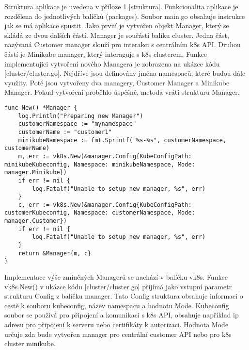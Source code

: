     Struktura aplikace je uvedena v příloze 1 [struktura]. Funkcionalita aplikace je rozdělena do jednotlivých balíčků (packages). Soubor main.go obsahuje instrukce jak se má aplikace spustit. Jako první je vytvořen objekt Manager, který se skládá ze dvou dalších částí. Manager je součástí balíku cluster. Jedna část, nazývaná Customer manager slouží pro interakci s centrálním k8s API. Druhou částí je Minikube manager, který interaguje s k8s clusterem. Funkce implementujici vytvoření nového Managera je zobrazena na ukázce kódu [cluster/cluster.go]. Nejdříve jsou definovány jména namespaců, které budou dále využity. Poté jsou vytvořeny dva managery, Customer Manager a Minikube Manager. Pokud vytvoření proběhlo úspěšně, metoda vrátí strukturu Manager. 

\begin{lstlisting}[caption=funkce vytvoření nového managera]
func New() *Manager {
	log.Println("Preparing new Manager")
	customerNamespace := "mynamespace"
	customerName := "customer1"
	minikubeNamespace := fmt.Sprintf("%s-%s", customerNamespace, customerName)
	m, err := vk8s.New(&manager.Config{KubeConfigPath: minikubeKubeconfig, Namespace: minikubeNamespace, Mode: manager.Minikube})
	if err != nil {
		log.Fatalf("Unable to setup new manager, %s", err)
	}
	c, err := vk8s.New(&manager.Config{KubeConfigPath: customerKubeconfig, Namespace: customerNamespace, Mode: manager.Customer})
	if err != nil {
		log.Fatalf("Unable to setup new manager, %s", err)
	}
	return &Manager{m, c}
}
\end{lstlisting}
\par
											Implementace výše zmíněných Managerů se nachází v balíčku vk8s. Funkce vk8s.New() v ukázce kódu [cluster/cluster.go] přijímá jako vstupní parametr strukturu Config z balíčku manager. Tato Config struktura obsahuje informaci o cestě k souboru kubeconfig, název namespacu a hodnotu Mode. Kubeconfig soubor se používá pro připojení a komunikaci s k8s API, obsahuje například ip adresu pro připojení k serveru nebo certifikáty k autorizaci. Hodnota Mode určuje zda bude vytvořen manager pro centrální customer API nebo pro k8s cluster minikube.\par 
